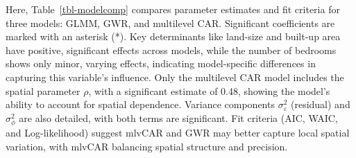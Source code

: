 \documentclass[
  default,
]{sn-jnl}
\begin{document}
Here, Table~\ref{tbl-modelcomp} compares parameter estimates and fit
criteria for three models: GLMM, GWR, and multilevel CAR. Significant
coefficients are marked with an asterisk (*). Key determinants like
land-size and built-up area have positive, significant effects across
models, while the number of bedrooms shows only minor, varying effects,
indicating model-specific differences in capturing this variable's
influence. Only the multilevel CAR model includes the spatial parameter
\(\rho\), with a significant estimate of 0.48, showing the model's
ability to account for spatial dependence. Variance components
\(\sigma_{\varepsilon}^2\) (residual) and \(\sigma_{\phi}^2\) are also
detailed, with both terms are significant. Fit criteria (AIC, WAIC, and
Log-likelihood) suggest mlvCAR and GWR may better capture local spatial
variation, with mlvCAR balancing spatial structure and precision.
\end{document}
